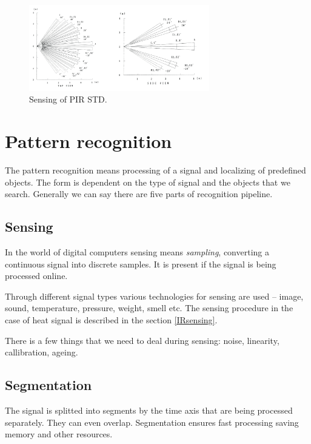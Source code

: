 \begin{figure}[h!]
\begin{center}
\includegraphics[width=0.7\textwidth]{img/roomsegments.png}
\caption{Sensing of PIR STD. \cite{PIROperationalManual}\label{fig:roomsegments}}
\end{center}    
\end{figure}



\newpage
\section{Pattern recognition}
The pattern recognition means processing of a signal and localizing of predefined objects.
The form is dependent on the type of signal and the objects that we search. Generally we can say
there are five parts of recognition pipeline.

\subsection*{Sensing}
In the world of digital computers sensing means {\it sampling}, converting a continuous signal
into discrete samples. It is present if the signal is being processed online.

Through different signal types various technologies for sensing are used -- image, sound, temperature,
pressure, weight, smell etc. The sensing procedure in the case of heat signal is described in the section
\ref{IRsensing}.

There is a few things that we need to deal during sensing: noise, linearity, callibration, ageing.

\subsection*{Segmentation}
The signal is splitted into segments by the time axis that are being processed separately. They can even overlap.
Segmentation ensures fast processing saving memory and other resources.

